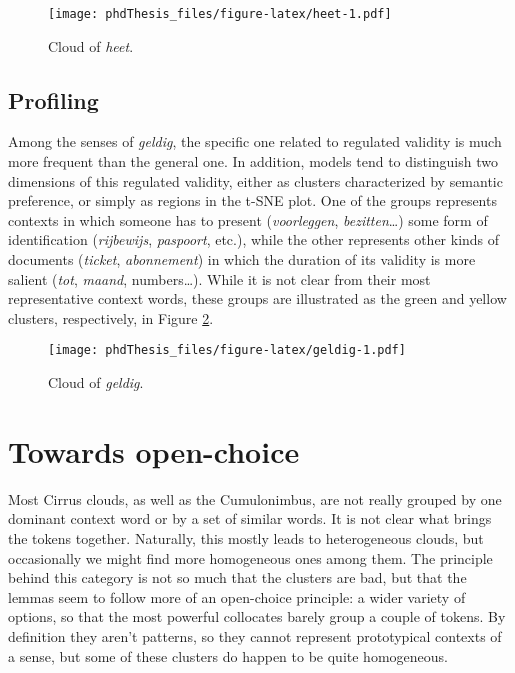 \documentclass[
]{book}
\begin{document}
\begin{figure}
\centering
\texttt{[image: phdThesis\_files/figure-latex/heet-1.pdf]}
\caption{\label{fig:heet}Cloud of \emph{heet}.}
\end{figure}

\hypertarget{profiling-2}{%
\subsection{Profiling}\label{profiling-2}}

Among the senses of \emph{geldig}, the specific one related to regulated validity is much more frequent than the general one. In addition, models tend to distinguish two dimensions of this regulated validity, either as clusters characterized by semantic preference, or simply as regions in the t-SNE plot. One of the groups represents contexts in which someone has to present (\emph{voorleggen}, \emph{bezitten}\ldots) some form of identification (\emph{rijbewijs}, \emph{paspoort}, etc.), while the other represents other kinds of documents (\emph{ticket}, \emph{abonnement}) in which the duration of its validity is more salient (\emph{tot}, \emph{maand}, numbers\ldots). While it is not clear from their most representative context words, these groups are illustrated as the green and yellow clusters, respectively, in Figure \ref{fig:geldig}.



\begin{figure}
\centering
\texttt{[image: phdThesis\_files/figure-latex/geldig-1.pdf]}
\caption{\label{fig:geldig}Cloud of \emph{geldig}.}
\end{figure}

\hypertarget{openchoice}{%
\section{Towards open-choice}\label{openchoice}}

Most Cirrus clouds, as well as the Cumulonimbus, are not really grouped by one dominant context word or by a set of similar words. It is not clear what brings the tokens together. Naturally, this mostly leads to heterogeneous clouds, but occasionally we might find more homogeneous ones among them. The principle behind this category is not so much that the clusters are bad, but that the lemmas seem to follow more of an open-choice principle: a wider variety of options, so that the most powerful collocates barely group a couple of tokens. By definition they aren't patterns, so they cannot represent prototypical contexts of a sense, but some of these clusters do happen to be quite homogeneous.
\end{document}
